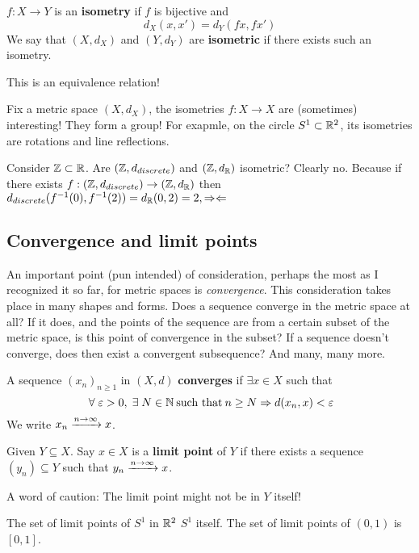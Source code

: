 \begin{definition} [Isometry]
$f: X \to Y$ is an \textbf{isometry} if $f$ is bijective and \[
d_X(x, x') = d_Y(fx, fx')
\]
We say that $(X, d_X)$ and $(Y, d_Y)$ are \textbf{isometric} if there exists such an isometry.

This is an equivalence relation!
\end{definition}

\begin{remark}
Fix a metric space $(X, d_X)$, the isometries $f: X \to X$ are (sometimes) interesting! They form a group! For exapmle, on the circle $S^1 \subset \mathbb{R}^2$, its isometries are rotations and line reflections.
\end{remark}

\begin{remark}
Consider $\mathbb{Z} \subset \mathbb{R}$. Are $(\mathbb{Z}, d_{discrete})$ and $(\mathbb{Z}, d_{\mathbb{R}})$ isometric? Clearly no. Because if there exists $f: (\mathbb{Z}, d_{discrete}) \to (\mathbb{Z}, d_{\mathbb{R}})$ then $d_{discrete}(f^{-1}(0), f^{-1}(2)) = d_{\mathbb{R}}(0, 2) = 2, \Rightarrow\Leftarrow$
\end{remark}

\subsection{Convergence and limit points}
An important point (pun intended) of consideration, perhaps the most as I recognized it so far, for metric spaces is \textit{convergence}. This consideration takes place in many shapes and forms. Does a sequence converge in the metric space at all? If it does, and the points of the sequence are from a certain subset of the metric space, is this point of convergence in the subset? If a sequence doesn't converge, does then exist a convergent subsequence? And many, many more. 

\begin{definition} [Convergence]
A sequence $(x_n)_{n \geq 1}$ in $(X, d)$ \textbf{converges} if $\exists x \in X$ such that \[
\forall \epsilon > 0, \exists N \in \bbn \:\text{such that}\: n \geq N \implies d(x_n, x) < \epsilon
\]
We write $x_n \xrightarrow{n \to \infty} x$.
\end{definition}

\begin{definition} 
Given $Y \subseteq X$. Say $x \in X$ is a \textbf{limit point} of $Y$ if there exists a sequence $(y_n) \subseteq Y$ such that $y_n \xrightarrow{n \to \infty} x$.

A word of caution: The limit point might not be in $Y$ itself!
\end{definition}
\begin{example}
The set of limit points of $S^1$ in $\mathbb{R}^2$  $S^1$ itself. The set of limit points of $(0, 1)$ is $[0, 1]$.
\end{example}

